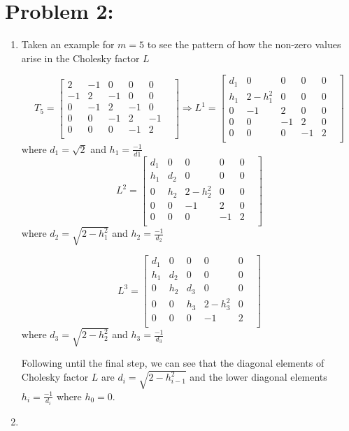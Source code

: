 \newpage
\section*{Problem 2:}
\begin{enumerate}
\item Taken an example for $m=5$ to see the pattern of how the non-zero values arise in the Cholesky factor $L$

$$
T_{5} = 
\begin{bmatrix}
2  & -1 & 0  & 0  & 0  &\\
-1 & 2  & -1 & 0  & 0  &\\
0  & -1 & 2  & -1 & 0  &\\
0  & 0  & -1 & 2  & -1 &\\
0  & 0  & 0  & -1 & 2  &\\
\end{bmatrix}
\Longrightarrow 
L^{1} = 
\begin{bmatrix}
d_{1} &  0           & 0  & 0  & 0  &\\
h_{1} & 2-h_{1}^{2}  & 0  & 0  & 0  &\\
0     & -1           & 2  &  0 & 0  &\\
0     & 0            & -1 & 2  & 0 &\\
0     & 0            & 0  & -1 & 2  &\\
\end{bmatrix}
$$
where $d_{1} = \sqrt{2}$ and $h_{1}= \frac{-1}{d1}$
$$
L^{2} = 
\begin{bmatrix}
d_{1} & 0     & 0            & 0  & 0  &\\
h_{1} & d_{2} &  0           & 0  & 0  &\\
0     & h_{2} & 2-h_{2}^{2}  &  0 & 0  &\\
0     & 0     & -1           & 2  &  0 &\\
0     & 0     & 0            & -1 & 2  &\\
\end{bmatrix}
$$
where $d_{2} = \sqrt{2-h_{1}^{2}}$ and $h_{2}= \frac{-1}{d_{2}}$

$$
L^{3} = 
\begin{bmatrix}
d_{1} & 0     & 0      & 0            & 0  &\\
h_{1} & d_{2} & 0      & 0            & 0  &\\
0     & h_{2} & d_{3}  & 0            & 0  &\\
0     & 0     & h_{3}  & 2-h_{3}^{2}  & 0  &\\
0     & 0     & 0      & -1           & 2  &\\
\end{bmatrix}
$$
where $d_{3} = \sqrt{2-h_{2}^{2}}$ and $h_{3}= \frac{-1}{d_{3}}$

Following until the final step, we can see that the diagonal elements of Cholesky factor $L$ are $d_{i} = \sqrt{2-h_{i-1}^{2}}$ and the lower diagonal elements $h_{i} = \frac{-1}{d_{i}}$ where $h_{0} = 0$.

\item 
\end{enumerate}